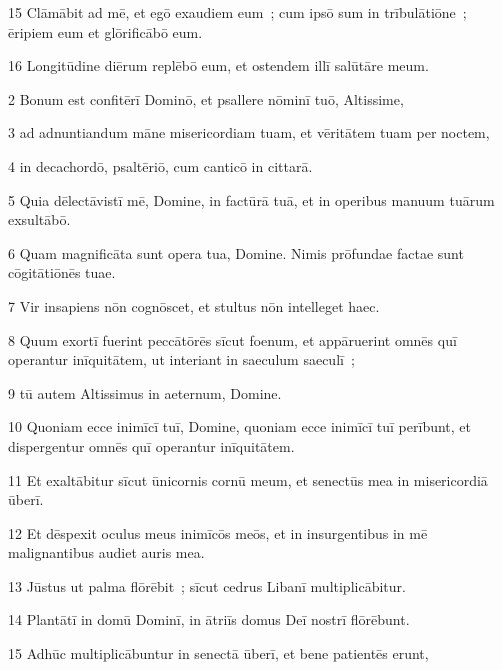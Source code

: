 \psalmVerse
  {\phantom{0}15}
  {Clāmābit ad mē, et egō exaudiem eum~; cum ipsō sum in trībulātiōne~; ēripiem eum et glōrificābō eum.}


\psalmVerse
  {\phantom{0}16}
  {Longitūdine diērum replēbō eum, et ostendem illī salūtāre meum.}




\psalmVerse
  {\phantom{00}2}
  {Bonum est confitērī Dominō, et psallere nōminī tuō, Altissime,}


\psalmVerse
  {\phantom{00}3}
  {ad adnuntiandum māne misericordiam tuam, et vēritātem tuam per noctem,}


\psalmVerse
  {\phantom{00}4}
  {in decachordō, psaltēriō, cum canticō in cittarā.}


\psalmVerse
  {\phantom{00}5}
  {Quia dēlectāvistī mē, Domine, in factūrā tuā, et in operibus manuum tuārum exsultābō.}


\psalmVerse
  {\phantom{00}6}
  {Quam magnificāta sunt opera tua, Domine. Nimis prōfundae factae sunt cōgitātiōnēs tuae.}


\psalmVerse
  {\phantom{00}7}
  {Vir insapiens nōn cognōscet, et stultus nōn intelleget haec.}


\psalmVerse
  {\phantom{00}8}
  {Quum exortī fuerint peccātōrēs sīcut foenum, et appāruerint omnēs quī operantur inīquitātem, ut interiant in saeculum saeculī~;}


\psalmVerse
  {\phantom{00}9}
  {tū autem Altissimus in aeternum, Domine.}


\psalmVerse
  {\phantom{0}10}
  {Quoniam ecce inimīcī tuī, Domine, quoniam ecce inimīcī tuī perībunt, et dispergentur omnēs quī operantur inīquitātem.}


\psalmVerse
  {\phantom{0}11}
  {Et exaltābitur sīcut ūnicornis cornū meum, et senectūs mea in misericordiā ūberī.}


\psalmVerse
  {\phantom{0}12}
  {Et dēspexit oculus meus inimīcōs meōs, et in insurgentibus in mē malignantibus audiet auris mea.}


\psalmVerse
  {\phantom{0}13}
  {Jūstus ut palma flōrēbit~; sīcut cedrus Libanī multiplicābitur.}


\psalmVerse
  {\phantom{0}14}
  {Plantātī in domū Dominī, in ātriīs domus Deī nostrī flōrēbunt.}


\psalmVerse
  {\phantom{0}15}
  {Adhūc multiplicābuntur in senectā ūberī, et bene patientēs erunt,}


